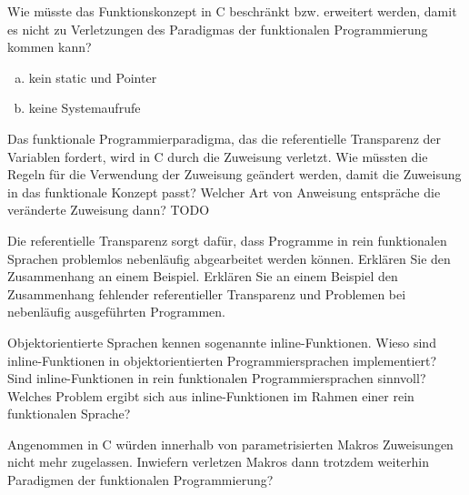 \begin{card}
	Wie müsste das Funktionskonzept in C beschränkt bzw. erweitert werden, damit es nicht zu Verletzungen des Paradigmas der funktionalen Programmierung kommen kann?
	\hr
	\begin{enumerate}[a)]
	\item kein static und Pointer 
	\item keine Systemaufrufe
	\end{enumerate}
\end{card}

\begin{card}
	Das funktionale Programmierparadigma, das die referentielle Transparenz der Variablen fordert, wird in C durch die Zuweisung verletzt. Wie müssten die Regeln für die Verwendung der Zuweisung geändert werden, damit die	Zuweisung in das funktionale Konzept passt? 
	\hr
	Welcher Art von Anweisung entspräche die veränderte Zuweisung dann? 
	TODO
\end{card}

\begin{card}
	Die referentielle Transparenz sorgt dafür, dass Programme in rein funktionalen Sprachen	problemlos nebenläufig abgearbeitet werden können. 
	Erklären Sie den Zusammenhang an einem Beispiel.
	Erklären Sie an einem Beispiel den Zusammenhang fehlender referentieller Transparenz und Problemen bei nebenläufig ausgeführten Programmen. 
\end{card}

\begin{card}
	Objektorientierte Sprachen kennen sogenannte inline-Funktionen.
	Wieso sind inline-Funktionen in objektorientierten Programmiersprachen implementiert?
	Sind inline-Funktionen in rein funktionalen Programmiersprachen sinnvoll?
	Welches Problem ergibt sich aus inline-Funktionen im Rahmen einer rein funktionalen	Sprache? 
\end{card}

\begin{card}
	Angenommen in C würden innerhalb von parametrisierten Makros Zuweisungen nicht mehr	zugelassen.	Inwiefern verletzen Makros dann trotzdem weiterhin Paradigmen der funktionalen Programmierung? 
\end{card}